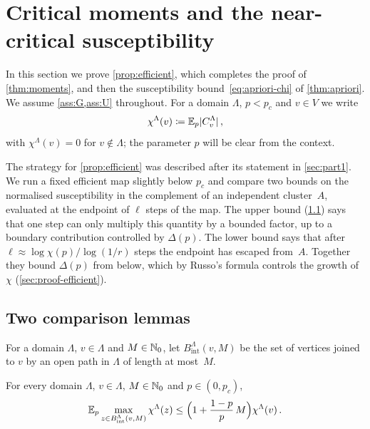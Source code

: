 \section{Critical moments and the near-critical susceptibility}\label{sec:moments}

In this section we prove \cref{prop:efficient}, which completes the proof of \cref{thm:moments}, and
then the susceptibility bound~\eqref{eq:apriori-chi} of \cref{thm:apriori}. We assume
\cref{ass:G,ass:U} throughout. For a domain $\Lambda$, $p<p_c$ and $v\in V$ we write
\begin{equation*}
  \chi^\Lambda(v)\coloneqq\mathbb E_p\lvert C^\Lambda_v\rvert\,,
\end{equation*}
with $\chi^\Lambda(v)=0$ for $v\notin\Lambda$; the parameter $p$ will be clear from the context.

The strategy for \cref{prop:efficient} was described after its statement in \cref{sec:part1}. We run a
fixed efficient map slightly below $p_c$ and compare two bounds on the normalised susceptibility in the
complement of an independent cluster~$A$, evaluated at the endpoint of $\ell$ steps of the map. The upper
bound (\cref{sec:comparison}) says that one step can only multiply this quantity by a bounded factor,
up to a boundary contribution controlled by $\Delta(p)$. The lower bound says that after
$\ell\approx\log\chi(p)/\log(1/r)$ steps the endpoint has escaped from~$A$. Together they bound $\Delta(p)$
from below, which by Russo's formula controls the growth of~$\chi$ (\cref{sec:proof-efficient}).

\subsection{Two comparison lemmas}\label{sec:comparison}

For a domain $\Lambda$, $v\in\Lambda$ and $M\in\mathbb N_0$, let $B^\Lambda_{\mathrm{int}}(v,M)$ be the set of
vertices joined to $v$ by an open path in $\Lambda$ of length at most~$M$.

\begin{lemma}\label{lem:intrinsic-ball}
For every domain $\Lambda$, $v\in\Lambda$, $M\in\mathbb N_0$ and $p\in(0,p_c)$,
\begin{equation}\label{eq:intrinsic-ball}
  \mathbb E_p\max_{z\in B^\Lambda_{\mathrm{int}}(v,M)}\chi^\Lambda(z)\le\Bigl(1+\frac{1-p}{p}\,M\Bigr)\chi^\Lambda(v)\,.
\end{equation}
\end{lemma}

